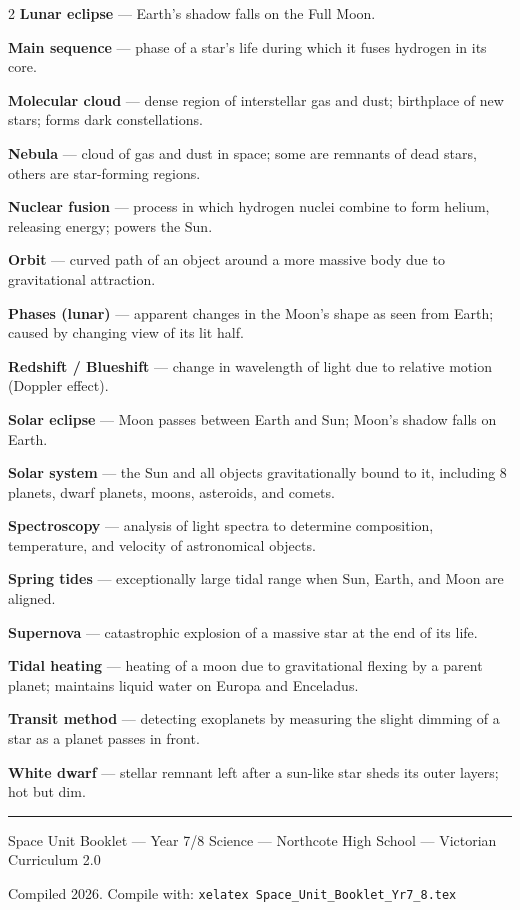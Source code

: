 \documentclass[11pt,a4paper]{article}
\begin{document}
\begin{multicols}{2}
\textbf{Lunar eclipse} --- Earth's shadow falls on the Full Moon.

\textbf{Main sequence} --- phase of a star's life during which it fuses hydrogen in its core.

\textbf{Molecular cloud} --- dense region of interstellar gas and dust; birthplace of new stars; forms dark constellations.

\textbf{Nebula} --- cloud of gas and dust in space; some are remnants of dead stars, others are star-forming regions.

\textbf{Nuclear fusion} --- process in which hydrogen nuclei combine to form helium, releasing energy; powers the Sun.

\textbf{Orbit} --- curved path of an object around a more massive body due to gravitational attraction.

\textbf{Phases (lunar)} --- apparent changes in the Moon's shape as seen from Earth; caused by changing view of its lit half.

\textbf{Redshift / Blueshift} --- change in wavelength of light due to relative motion (Doppler effect).

\textbf{Solar eclipse} --- Moon passes between Earth and Sun; Moon's shadow falls on Earth.

\textbf{Solar system} --- the Sun and all objects gravitationally bound to it, including 8 planets, dwarf planets, moons, asteroids, and comets.

\textbf{Spectroscopy} --- analysis of light spectra to determine composition, temperature, and velocity of astronomical objects.

\textbf{Spring tides} --- exceptionally large tidal range when Sun, Earth, and Moon are aligned.

\textbf{Supernova} --- catastrophic explosion of a massive star at the end of its life.

\textbf{Tidal heating} --- heating of a moon due to gravitational flexing by a parent planet; maintains liquid water on Europa and Enceladus.

\textbf{Transit method} --- detecting exoplanets by measuring the slight dimming of a star as a planet passes in front.

\textbf{White dwarf} --- stellar remnant left after a sun-like star sheds its outer layers; hot but dim.
\end{multicols}
\vspace{1em}
\begin{center}
\textcolor{Gold}{\rule{8cm}{1.5pt}}

\vspace{0.6em}
{\headingfont\color{Grey}\small Space Unit Booklet --- Year 7/8 Science ---
Northcote High School --- Victorian Curriculum 2.0}

\vspace{0.2em}
{\small\color{Grey} Compiled 2026. Compile with: \texttt{xelatex Space\_Unit\_Booklet\_Yr7\_8.tex}}
\end{center}
\end{document}
